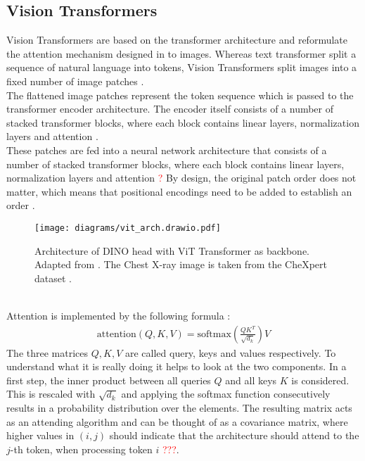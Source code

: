\subsection{Vision Transformers}
Vision Transformers are based on the transformer architecture and reformulate the attention mechanism designed in \cite{Vaswani2017} to images.
Whereas text transformer split a sequence of natural language into tokens, Vision Transformers split images into a fixed number of image patches \citep{Dosovitskiy2020}.
\\
The flattened image patches represent the token sequence which is passed to the transformer encoder architecture.
The encoder itself consists of a number of stacked transformer blocks, where each block contains linear layers, normalization layers and attention \citep{Vaswani2017,Dosovitskiy2020}.
\\
These patches are fed into a neural network architecture that consists of a number of stacked transformer blocks, where each block contains linear layers, normalization layers and attention \textcolor{red}{?}
By design, the original patch order does not matter, which means that positional encodings need to be added to establish an order \citep{Dosovitskiy2020,Vaswani2017}.
\begin{figure}[ht]
	\centering
    \texttt{[image: diagrams/vit\_arch.drawio.pdf]}
	\caption{Architecture of DINO head with ViT Transformer as backbone. Adapted from \citep{Dosovitskiy2020}. The Chest X-ray image is taken from the CheXpert dataset \citep{Irvin2019}.}
	\label{methods-vit-arch}
\end{figure}
\\
Attention is implemented by the following formula \citep{Vaswani2017}:
\begin{align}
    \text{attention}(Q,K,V) = \text{softmax}(\frac{QK^T}{\sqrt{d_k}})V
\end{align}
The three matrices $Q,K,V$ are called query, keys and values respectively.
To understand what it is really doing it helps to look at the two components.
In a first step, the inner product between all queries $Q$ and all keys $K$ is considered.
This is rescaled with $\sqrt{d_k}$ and applying the softmax function consecutively results in a probability distribution over the elements.
The resulting matrix acts as an attending algorithm and can be thought of as a covariance matrix, where higher values in $(i,j)$ should indicate that the architecture should attend to the $j$-th token, when processing token $i$ \citep{Vaswani2017} \textcolor{red}{???}.    
\par
